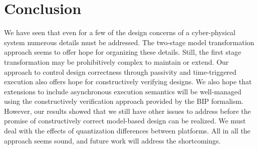 \section{Conclusion}

We have seen that even for a few of the design concerns of a cyber-physical system
numerous details must be addressed.  The two-stage model transformation approach 
seems to offer hope for organizing these details.  Still, the first stage 
transformation may be prohibitively complex to maintain or extend.  Our approach 
to control design correctness through passivity and time-triggered execution also
offers hope for constructively verifying designs.  We also hope that extensions to
include asynchronous execution semantics will be well-managed using the constructively
verification approach provided by the BIP formalism.  However, our results showed that
we still have other issues to address before the promise of constructively correct 
model-based design can be realized. We must deal with the effects of quantization 
differences between platforms.   All in all the approach seems sound, and future 
work will address the shortcomings.